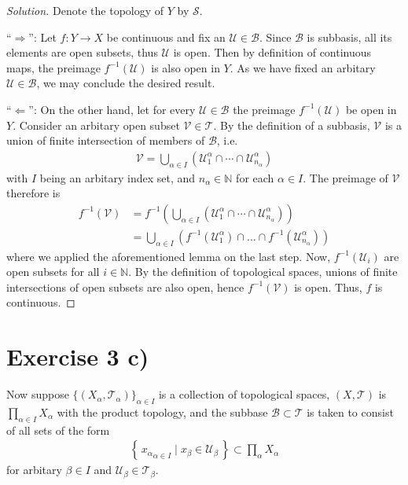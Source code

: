 \documentclass[a4paper]{article}
\theoremstyle{definition}
\newcommand{\makeset}[2]{\left\{\, #1 \mid #2 \,\right\}}
\begin{document}
\begin{proof}[Solution]
    Denote the topology of \(Y\) by \(\mathcal{S}\).

    ``\(\Rightarrow\)'': Let \(f: Y \longrightarrow X\) be continuous and fix an \(\mathcal{U} \in \mathcal{B}\). Since \(\mathcal{B}\) is subbasis, all its elements are open subsets, thus \(\mathcal{U}\) is open. Then by definition of continuous maps, the preimage \(f^{-1}(\mathcal{U})\) is also open in \(Y\). As we have fixed an arbitary \(\mathcal{U} \in \mathcal{B}\), we may conclude the desired result.

    ``\(\Leftarrow\)'': On the other hand, let for every \(\mathcal{U} \in \mathcal{B}\) the preimage \(f^{-1}(\mathcal{U})\) be open in \(Y\). Consider an arbitary open subset \(\mathcal{V} \in \mathcal{T}\). By the definition of a subbasis, \(\mathcal{V}\) is a union of finite intersection of members of \(\mathcal{B}\), i.e.
    \begin{align*}
        \mathcal{V} = \bigcup_{\alpha \in I} \left(\mathcal{U}_1^\alpha \cap \cdots \cap \mathcal{U}^\alpha_{n_\alpha} \right)
    \end{align*}
    with \(I\) being an arbitary index set, and \(n_\alpha \in \mathbb{N}\) for each \(\alpha \in I\). The preimage of \(\mathcal{V}\) therefore is
    \begin{align*}
        f^{-1}(\mathcal{V}) &= f^{-1}\left(\bigcup_{\alpha \in I} \left(\mathcal{U}_1^\alpha \cap \cdots \cap \mathcal{U}^\alpha_{n_\alpha} \right)\right) \\
        &= \bigcup_{\alpha \in I} \left( f^{-1}(\mathcal{U}_1^\alpha) \cap \ldots \cap f^{-1}(\mathcal{U}_{n_\alpha}^\alpha) \right)
    \end{align*}
    where we applied the aforementioned lemma on the last step. Now, \(f^{-1}(\mathcal{U}_i)\) are open subsets for all \(i \in \mathbb{N}\). By the definition of topological spaces, unions of finite intersections of open subsets are also open, hence \(f^{-1}(\mathcal{V})\) is open. Thus, \(f\) is continuous.
\end{proof}


\section*{Exercise 3 c)}

Now suppose \(\{(X_\alpha, \mathcal{T}_\alpha)\}_{\alpha \in I}\) is a collection of topological spaces, \((X, \mathcal{T})\) is \(\prod_{\alpha \in I} X_\alpha\) with the product topology, and the subbase \(\mathcal{B} \subset \mathcal{T}\) is taken to consist of all sets of the form
\begin{align*}
    \makeset{{x_\alpha}_{\alpha \in I}}{x_\beta \in \mathcal{U}_\beta} \subset \prod_\alpha X_\alpha
\end{align*}
for arbitary \(\beta \in I\) and \(\mathcal{U}_\beta \in \mathcal{T}_\beta\).
\end{document}
